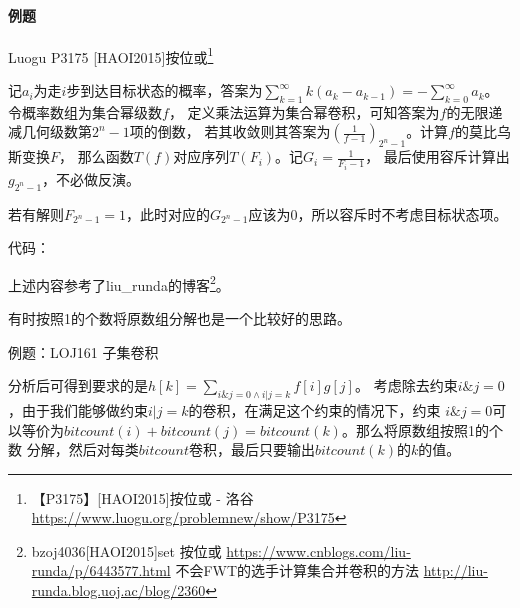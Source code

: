 \paragraph{例题}
Luogu P3175 [HAOI2015]按位或\footnote{
    【P3175】[HAOI2015]按位或 - 洛谷
    \url{https://www.luogu.org/problemnew/show/P3175}
}

记$a_i$为走$i$步到达目标状态的概率，答案为$\displaystyle \sum_{k=1}^
\infty{k(a_k-a_{k-1})}=-\sum_{k=0}^\infty a_k$。令概率数组为集合幂级数$f$，
定义乘法运算为集合幂卷积，可知答案为$f$的无限递减几何级数第$2^n-1$项的倒数，
若其收敛则其答案为$\left(\frac{1}{f-1}\right)_{2^n-1}$。计算$f$的莫比乌斯变换$F$，
那么函数$T(f)$对应序列${T(F_i)}$。记$G_i={\frac{1}{F_i-1}}$，
最后使用容斥计算出$g_{2^n-1}$，不必做反演。

若有解则$F_{2^n-1}=1$，此时对应的$G_{2^n-1}$应该为0，所以容斥时不考虑目标状态项。

代码：


上述内容参考了liu\_runda的博客\footnote{
    bzoj4036[HAOI2015]set 按位或
    \url{https://www.cnblogs.com/liu-runda/p/6443577.html}
    不会FWT的选手计算集合并卷积的方法
    \url{http://liu-runda.blog.uoj.ac/blog/2360}
}。

有时按照1的个数将原数组分解也是一个比较好的思路。

例题：LOJ161 子集卷积

分析后可得到要求的是$h[k]=\displaystyle \sum_{i\&j=0 \land i|j=k}{f[i]g[j]}$。
考虑除去约束$i\&j=0$，由于我们能够做约束$i|j=k$的卷积，在满足这个约束的情况下，约束
$i\&j=0$可以等价为$bitcount(i)+bitcount(j)=bitcount(k)$。那么将原数组按照1的个数
分解，然后对每类$bitcount$卷积，最后只要输出$bitcount(k)$的$k$的值。
